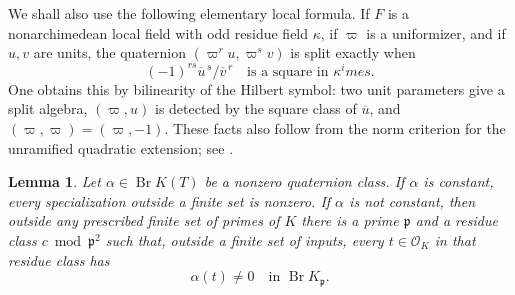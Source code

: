 \documentclass[11pt]{article}
\newtheorem{lemma}[theorem]{Lemma}
\theoremstyle{definition}
\begin{document}
We shall also use the following elementary local formula.  If $F$ is a
nonarchimedean local field with odd residue field $\kappa$, if $\varpi$
is a uniformizer, and if $u,v$ are units, the quaternion
$(\varpi^r u,\varpi^s v)$ is split exactly when
\[
                    (-1)^{rs}\overline u^{\,s}/\overline v^{\,r}
                    \quad\text{is a square in }\kappa^	imes.
\]
One obtains this by bilinearity of the Hilbert symbol: two unit
parameters give a split algebra, $(\varpi,u)$ is detected by the square
class of $\overline u$, and $(\varpi,\varpi)=(\varpi,-1)$.
These facts also follow from the norm criterion for the unramified
quadratic extension; see \cite[Proposition~5.5]{p2lbVoight2019}.

\begin{lemma}\label{p2lb:brauer-progression}
Let $\alpha\in\operatorname{Br}K(T)$ be a nonzero quaternion class.
If $\alpha$ is constant, every specialization outside a finite set
is nonzero.  If $\alpha$ is not constant, then outside any prescribed
finite set of primes of $K$ there is a prime $\mathfrak p$ and a
residue class $c\bmod\mathfrak p^2$ such that, outside a finite set
of inputs, every $t\in\mathcal O_K$ in that residue class has
\[
                   \alpha(t)\ne0\quad\text{in }
                   \operatorname{Br}K_{\mathfrak p}.
\]
\end{lemma}
\end{document}
